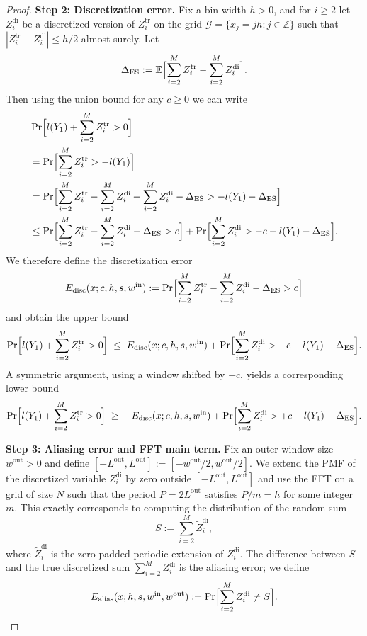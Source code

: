 \documentclass{article}
\theoremstyle{plain}
\theoremstyle{definition}
\begin{document}
\begin{proof}
\medskip

\textbf{Step 2: Discretization error.}
Fix a bin width $h>0$, and for $i\ge2$ let $Z_i^{\mathrm{di}}$ be a discretized version of
$Z_i^{\mathrm{tr}}$ on the grid $\mathcal G = \{x_j=jh:j\in\mathbb Z\}$ such that
$|Z_i^{\mathrm{tr}}-Z_i^{\mathrm{di}}|\le h/2$ almost surely.
Let
\[
  \Delta_{\mathrm{ES}} := \mathbb E\Bigl[\sum_{i=2}^M Z_i^{\mathrm{tr}} - \sum_{i=2}^M Z_i^{\mathrm{di}}\Bigr].
\]
Then using the union bound for any $c\ge0$ we can write
\begin{align*}
  &\Pr\Bigl[l(Y_1)+\sum_{i=2}^M Z_i^{\mathrm{tr}} > 0\Bigr] \\
  &= \Pr\Bigl[
    \sum_{i=2}^M Z_i^{\mathrm{tr}} > -l(Y_1)
  \Bigr] \\
  &= \Pr\Bigl[
    \sum_{i=2}^M Z_i^{\mathrm{tr}} - \sum_{i=2}^M Z_i^{\mathrm{di}}
    + \sum_{i=2}^M Z_i^{\mathrm{di}}
    - \Delta_{\mathrm{ES}}
    > -l(Y_1)-\Delta_{\mathrm{ES}}
  \Bigr] \\
  &\le
  \Pr\Bigl[
    \sum_{i=2}^M Z_i^{\mathrm{tr}} - \sum_{i=2}^M Z_i^{\mathrm{di}} - \Delta_{\mathrm{ES}} > c
  \Bigr]
  +
  \Pr\Bigl[
    \sum_{i=2}^M Z_i^{\mathrm{di}} > -c - l(Y_1) - \Delta_{\mathrm{ES}}
  \Bigr].
\end{align*}
We therefore define the discretization error
\[
  E_{\mathrm{disc}}(x;c,h,s,w^{\mathrm{in}})
  :=
  \Pr\Bigl[
    \sum_{i=2}^M Z_i^{\mathrm{tr}} - \sum_{i=2}^M Z_i^{\mathrm{di}} - \Delta_{\mathrm{ES}} > c
  \Bigr]
\]
and obtain the upper bound
\begin{equation}
  \label{eq:disc-upper}
  \Pr\Bigl[l(Y_1)+\sum_{i=2}^M Z_i^{\mathrm{tr}} > 0\Bigr]
  \;\le\;
  E_{\mathrm{disc}}(x;c,h,s,w^{\mathrm{in}})
  +
  \Pr\Bigl[
    \sum_{i=2}^M Z_i^{\mathrm{di}} > -c - l(Y_1) - \Delta_{\mathrm{ES}}
  \Bigr].
\end{equation}
A symmetric argument, using a window shifted by $-c$, yields a corresponding lower bound
\begin{equation}
  \label{eq:disc-lower}
  \Pr\Bigl[l(Y_1)+\sum_{i=2}^M Z_i^{\mathrm{tr}} > 0\Bigr]
  \;\ge\;
  -E_{\mathrm{disc}}(x;c,h,s,w^{\mathrm{in}})
  +
  \Pr\Bigl[
    \sum_{i=2}^M Z_i^{\mathrm{di}} > +c - l(Y_1) - \Delta_{\mathrm{ES}}
  \Bigr].
\end{equation}

\medskip

\textbf{Step 3: Aliasing error and FFT main term.}
Fix an outer window size $w^{\mathrm{out}}>0$ and define
$[-L^{\mathrm{out}},L^{\mathrm{out}}] := [-w^{\mathrm{out}}/2,w^{\mathrm{out}}/2]$.
We extend the PMF of the discretized variable $Z_i^{\mathrm{di}}$ by zero outside
$[-L^{\mathrm{out}},L^{\mathrm{out}}]$ and use the FFT on a grid of size $N$ such that
the period $P=2L^{\mathrm{out}}$ satisfies $P/m=h$ for some integer $m$.
This exactly corresponds to computing the distribution of the random sum
\[
  S
  :=
  \sum_{i=2}^M \widetilde Z_i^{\mathrm{di}},
\]
where $\widetilde Z_i^{\mathrm{di}}$ is the zero-padded periodic extension of $Z_i^{\mathrm{di}}$.
The difference between $S$ and the true discretized sum
$\sum_{i=2}^M Z_i^{\mathrm{di}}$ is the aliasing error; we define
\[
  E_{\mathrm{alias}}(x;h,s,w^{\mathrm{in}},w^{\mathrm{out}})
  :=
  \Pr\Bigl[\sum_{i=2}^M Z_i^{\mathrm{di}} \neq S\Bigr].
\]


\end{proof}
\end{document}

